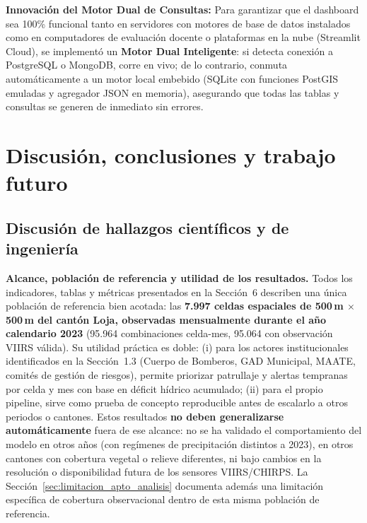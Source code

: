 \documentclass[11pt,a4paper]{article}
\begin{document}
\noindent\textbf{Innovaci\'on del Motor Dual de Consultas:} Para garantizar que el dashboard sea 100\% funcional tanto en servidores con motores de base de datos instalados como en computadores de evaluaci\'on docente o plataformas en la nube (Streamlit Cloud), se implement\'o un \textbf{Motor Dual Inteligente}: si detecta conexi\'on a PostgreSQL o MongoDB, corre en vivo; de lo contrario, conmuta autom\'aticamente a un motor local embebido (SQLite con funciones PostGIS emuladas y agregador JSON en memoria), asegurando que todas las tablas y consultas se generen de inmediato sin errores.

\section{Discusi\'on, conclusiones y trabajo futuro}

\subsection{Discusi\'on de hallazgos cient\'ificos y de ingenier\'ia}
\textbf{Alcance, poblaci\'on de referencia y utilidad de los resultados.} Todos los indicadores, tablas y m\'etricas presentados en la Secci\'on~6 describen una \'unica poblaci\'on de referencia bien acotada: las \textbf{7.997 celdas espaciales de 500\,m $\times$ 500\,m del cant\'on Loja, observadas mensualmente durante el a\~no calendario 2023} (95.964 combinaciones celda-mes, 95.064 con observaci\'on VIIRS v\'alida). Su utilidad pr\'actica es doble: (i) para los actores institucionales identificados en la Secci\'on~1.3 (Cuerpo de Bomberos, GAD Municipal, MAATE, comit\'es de gesti\'on de riesgos), permite priorizar patrullaje y alertas tempranas por celda y mes con base en d\'eficit h\'idrico acumulado; (ii) para el propio pipeline, sirve como prueba de concepto reproducible antes de escalarlo a otros periodos o cantones. Estos resultados \textbf{no deben generalizarse autom\'aticamente} fuera de ese alcance: no se ha validado el comportamiento del modelo en otros a\~nos (con reg\'imenes de precipitaci\'on distintos a 2023), en otros cantones con cobertura vegetal o relieve diferentes, ni bajo cambios en la resoluci\'on o disponibilidad futura de los sensores VIIRS/CHIRPS. La Secci\'on~\ref{sec:limitacion_apto_analisis} documenta adem\'as una limitaci\'on espec\'ifica de cobertura observacional dentro de esta misma poblaci\'on de referencia.
\end{document}
